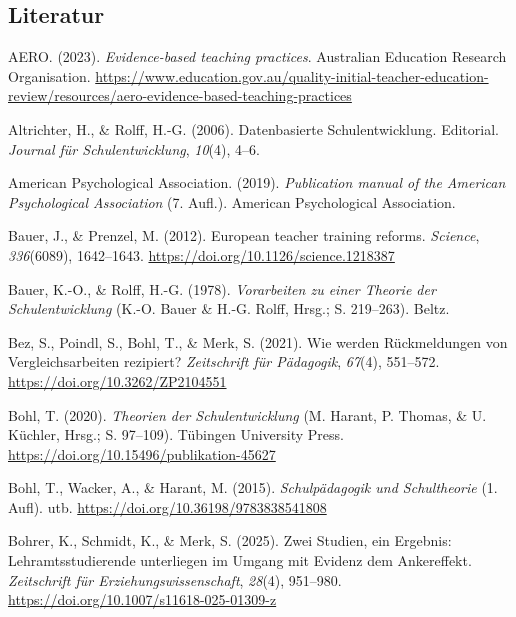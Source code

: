 \documentclass[
  man,
  floatsintext,
  longtable,
  nolmodern,
  notxfonts,
  notimes,
  colorlinks=true,linkcolor=blue,citecolor=blue,urlcolor=blue]{apa7}
\newlength{\cslhangindent}
\newenvironment{CSLReferences}[2] %
 {\begin{list}{}{%
  \setlength{\itemindent}{0pt}
  \setlength{\leftmargin}{0pt}
  \setlength{\parsep}{0pt}
  \ifodd #1
   \setlength{\leftmargin}{\cslhangindent}
   \setlength{\itemindent}{-1\cslhangindent}
  \fi
  \setlength{\itemsep}{#2\baselineskip}}}
 {\end{list}}
\begin{document}
\subsection{Literatur}\label{literatur}

\label{refs}
\begin{CSLReferences}{1}{0}
AERO. (2023). \emph{Evidence-based teaching practices}. Australian
Education Research Organisation.
\url{https://www.education.gov.au/quality-initial-teacher-education-review/resources/aero-evidence-based-teaching-practices}

Altrichter, H., \& Rolff, H.-G. (2006). Datenbasierte Schulentwicklung.
Editorial. \emph{Journal für Schulentwicklung}, \emph{10}(4), 4--6.

American Psychological Association. (2019). \emph{Publication manual of
the American Psychological Association} (7. Aufl.). American
Psychological Association.

Bauer, J., \& Prenzel, M. (2012). European teacher training reforms.
\emph{Science}, \emph{336}(6089), 1642--1643.
\url{https://doi.org/10.1126/science.1218387}

Bauer, K.-O., \& Rolff, H.-G. (1978). \emph{Vorarbeiten zu einer Theorie
der Schulentwicklung} (K.-O. Bauer \& H.-G. Rolff, Hrsg.; S. 219--263).
Beltz.

Bez, S., Poindl, S., Bohl, T., \& Merk, S. (2021). Wie werden
Rückmeldungen von Vergleichsarbeiten rezipiert? \emph{Zeitschrift für
Pädagogik}, \emph{67}(4), 551--572.
\url{https://doi.org/10.3262/ZP2104551}

Bohl, T. (2020). \emph{Theorien der Schulentwicklung} (M. Harant, P.
Thomas, \& U. Küchler, Hrsg.; S. 97--109). Tübingen University Press.
\url{https://doi.org/10.15496/publikation-45627}

Bohl, T., Wacker, A., \& Harant, M. (2015). \emph{Schulpädagogik und
Schultheorie} (1. Aufl). utb.
\url{https://doi.org/10.36198/9783838541808}

Bohrer, K., Schmidt, K., \& Merk, S. (2025). {Zwei Studien, ein
Ergebnis: Lehramtsstudierende unterliegen im Umgang mit Evidenz dem
Ankereffekt}. \emph{Zeitschrift für Erziehungswissenschaft},
\emph{28}(4), 951--980. \url{https://doi.org/10.1007/s11618-025-01309-z}


\end{CSLReferences}
\end{document}
